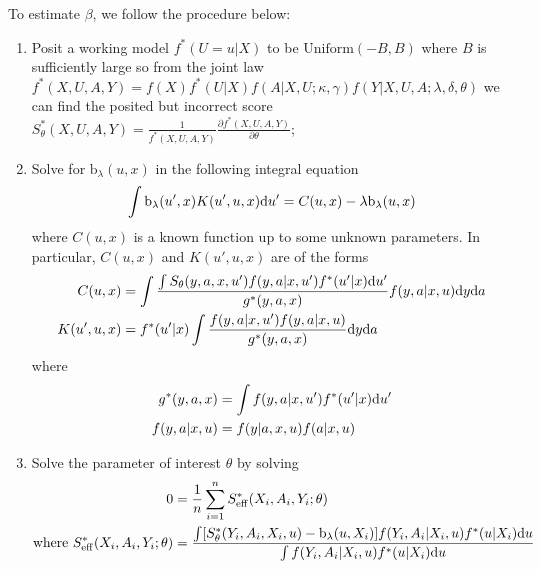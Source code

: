 \documentclass[11pt]{article}
\def\eff{\mathrm{eff}}
\begin{document}
\begin{example}
To estimate $\beta$, we follow the procedure below:
\begin{enumerate}
\item Posit a working model $f^{\ast} (U = u | X)$ to be $\text{Uniform} (-B, B)$ where $B$ is sufficiently large so from the joint law $f^{\ast} (X, U, A, Y) = f (X) f^{\ast} (U | X) f (A | X, U; \kappa, \gamma) f (Y | X, U, A; \lambda, \delta, \theta)$ we can find the posited but incorrect score $S_{\theta}^{\ast} (X, U, A, Y) = \frac{1}{f^{\ast} (X, U, A, Y)} \frac{\partial f^{\ast} (X, U, A, Y)}{\partial \theta}$;
\item Solve for $\mathrm{b}_{\lambda} (u, x)$ in the following integral equation
\begin{equation}
\label{fred-sensitivity}
\int \mathrm{b}_{\lambda} (u', x) K (u', u, x) \mathrm{d} u' = C (u, x) - \lambda \mathrm{b}_{\lambda} (u, x)
\end{equation}
where $C (u, x)$ is a known function up to some unknown parameters. In particular, $C (u, x)$ and $K (u', u, x)$ are of the forms
\begin{equation}
\begin{split}
C (u, x) & = \int \frac{\int S_{\theta} (y, a, x, u') f (y, a | x, u') f^{\ast} (u' | x) \mathrm{d} u'}{g^{\ast} (y, a, x)} f (y, a | x, u) \mathrm{d} y \mathrm{d} a \\
K (u', u, x) & = f^{\ast} (u' | x) \int \frac{f (y, a | x, u') f (y, a | x, u)}{g^{\ast} (y, a, x)} \mathrm{d} y \mathrm{d} a
\end{split}
\end{equation}
where
\begin{equation}
\begin{split}
g^{\ast} (y, a, x) & = \int f (y, a | x, u') f^{\ast} (u' | x) \mathrm{d} u' \\
f (y, a | x, u) & = f (y | a, x, u) f (a | x, u)
\end{split}
\end{equation}
\item Solve the parameter of interest $\theta$ by solving
\begin{equation}
\label{score-sensitivity}
\begin{split}
0 & = \frac{1}{n} \sum_{i = 1}^{n} S_{\eff}^{\ast} (X_{i}, A_{i}, Y_{i}; \theta) \\
\text{where } S_{\eff}^{\ast} (X_{i}, A_{i}, Y_{i}; \theta) & = \frac{\int [S_{\theta}^{\ast} (Y_{i}, A_{i}, X_{i}, u) - \mathrm{b}_{\lambda} (u, X_{i})] f (Y_{i}, A_{i} | X_{i}, u) f^{\ast} (u | X_{i}) \diff u}{\int f (Y_{i}, A_{i} | X_{i}, u) f^{\ast} (u | X_{i}) \diff u}
\end{split}
\end{equation}
\end{enumerate}


\end{example}
\end{document}
